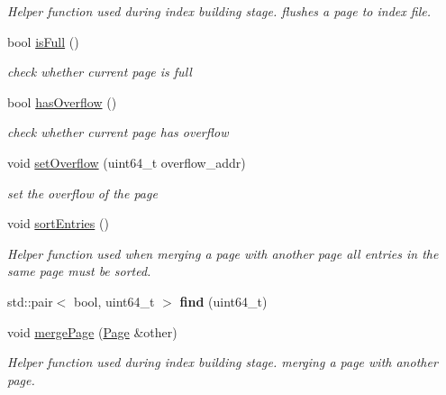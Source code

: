 \begin{DoxyCompactItemize}
\begin{DoxyCompactList}\small\item\em Helper function used during index building stage. flushes a page to index file. \end{DoxyCompactList}\item 
\hypertarget{class_page_ac8eaa244c45b970832a714927fdad424}{}bool \hyperlink{class_page_ac8eaa244c45b970832a714927fdad424}{is\+Full} ()\label{class_page_ac8eaa244c45b970832a714927fdad424}

\begin{DoxyCompactList}\small\item\em check whether current page is full \end{DoxyCompactList}\item 
\hypertarget{class_page_a38336065dbdaf6bf02b4eb17c9de5435}{}bool \hyperlink{class_page_a38336065dbdaf6bf02b4eb17c9de5435}{has\+Overflow} ()\label{class_page_a38336065dbdaf6bf02b4eb17c9de5435}

\begin{DoxyCompactList}\small\item\em check whether current page has overflow \end{DoxyCompactList}\item 
\hypertarget{class_page_acf084e21946e416d82fecab30ec3576a}{}void \hyperlink{class_page_acf084e21946e416d82fecab30ec3576a}{set\+Overflow} (uint64\+\_\+t overflow\+\_\+addr)\label{class_page_acf084e21946e416d82fecab30ec3576a}

\begin{DoxyCompactList}\small\item\em set the overflow of the page \end{DoxyCompactList}\item 
\hypertarget{class_page_a562f9dd698df89d7d7fa48d0237f0a26}{}void \hyperlink{class_page_a562f9dd698df89d7d7fa48d0237f0a26}{sort\+Entries} ()\label{class_page_a562f9dd698df89d7d7fa48d0237f0a26}

\begin{DoxyCompactList}\small\item\em Helper function used when merging a page with another page all entries in the same page must be sorted. \end{DoxyCompactList}\item 
\hypertarget{class_page_aad61b7644bf5e986cb6b1dc35bddad10}{}std\+::pair$<$ bool, uint64\+\_\+t $>$ {\bfseries find} (uint64\+\_\+t)\label{class_page_aad61b7644bf5e986cb6b1dc35bddad10}

\item 
\hypertarget{class_page_ab28dfd54e442f3f757f5a8906256517a}{}void \hyperlink{class_page_ab28dfd54e442f3f757f5a8906256517a}{merge\+Page} (\hyperlink{class_page}{Page} \&other)\label{class_page_ab28dfd54e442f3f757f5a8906256517a}

\begin{DoxyCompactList}\small\item\em Helper function used during index building stage. merging a page with another page. \end{DoxyCompactList}\end{DoxyCompactItemize}
